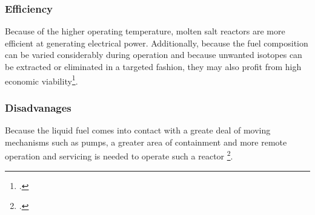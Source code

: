 \subsubsection{Efficiency}
Because of the higher operating temperature, molten salt reactors are more efficient at generating
electrical power. Additionally, because the fuel composition can be varied considerably during operation
and because unwanted isotopes can be extracted or eliminated in a targeted fashion, they may also
profit from high economic viability\footcite[159-161]{IVHandbook}.
\subsubsection{Disadvanages}
Because the liquid fuel comes into contact with a greate deal of moving mechanisms such as pumps, a
greater area of containment and more remote operation and servicing is needed to operate such a reactor
\footcite{msrs}.